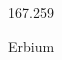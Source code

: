 \documentclass[12pt]{article}
\begin{document}
\hfill{}
\vfill
\begin{center}
  {\fontsize{50}{60}
  }

  \vspace{1em}

  167.259

Erbium
\end{center}
\vfill
\end{document}
